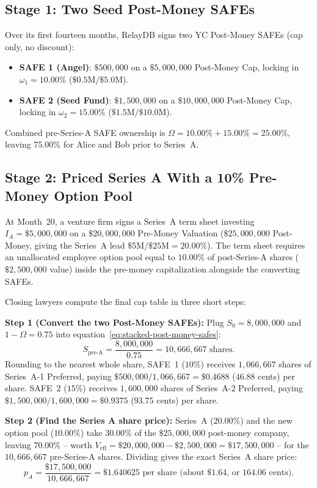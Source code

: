 \subsection{Stage 1: Two Seed Post-Money SAFEs}

Over its first fourteen months, RelayDB signs two YC Post-Money SAFEs (cap only, no discount):
\begin{itemize}
  \item \textbf{SAFE 1 (Angel)}: $\$500{,}000$ on a $\$5{,}000{,}000$ Post-Money Cap, locking in $\omega_1 = 10.00\%$ ($\$0.5\text{M} / \$5.0\text{M}$).
  \item \textbf{SAFE 2 (Seed Fund)}: $\$1{,}500{,}000$ on a $\$10{,}000{,}000$ Post-Money Cap, locking in $\omega_2 = 15.00\%$ ($\$1.5\text{M} / \$10.0\text{M}$).
\end{itemize}
Combined pre-Series-A SAFE ownership is $\Omega = 10.00\% + 15.00\% = 25.00\%$, leaving $75.00\%$ for Alice and Bob prior to Series~A.

\subsection{Stage 2: Priced Series A With a 10\% Pre-Money Option Pool}

At Month~20, a venture firm signs a Series~A term sheet investing $I_A = \$5{,}000{,}000$ on a $\$20{,}000{,}000$ Pre-Money Valuation ($\$25{,}000{,}000$ Post-Money, giving the Series~A lead $\$5\text{M} / \$25\text{M} = 20.00\%$). The term sheet requires an unallocated employee option pool equal to $10.00\%$ of post-Series-A shares ($\$2{,}500{,}000$ value) inside the pre-money capitalization alongside the converting SAFEs.

Closing lawyers compute the final cap table in three short steps:

\textbf{Step 1 (Convert the two Post-Money SAFEs):} Plug $S_0 = 8{,}000{,}000$ and $1 - \Omega = 0.75$ into equation~\eqref{eq:stacked-post-money-safes}:
\[
  S_{\text{pre-A}} = \frac{8{,}000{,}000}{0.75} = 10{,}666{,}667 \text{ shares.}
\]
Rounding to the nearest whole share, SAFE~1 ($10\%$) receives $1{,}066{,}667$ shares of Series~A-1 Preferred, paying $\$500{,}000 / 1{,}066{,}667 = \$0.4688$ ($46.88$ cents) per share. SAFE~2 ($15\%$) receives $1{,}600{,}000$ shares of Series~A-2 Preferred, paying $\$1{,}500{,}000 / 1{,}600{,}000 = \$0.9375$ ($93.75$ cents) per share.

\textbf{Step 2 (Find the Series A share price):} Series~A ($20.00\%$) and the new option pool ($10.00\%$) take $30.00\%$ of the $\$25{,}000{,}000$ post-money company, leaving $70.00\%$ -- worth $V_{\text{eff}} = \$20{,}000{,}000 - \$2{,}500{,}000 = \$17{,}500{,}000$ -- for the $10{,}666{,}667$ pre-Series-A shares. Dividing gives the exact Series~A share price:
\[
  p_A = \frac{\$17{,}500{,}000}{10{,}666{,}667} = \$1.640625 \text{ per share (about \$1.64, or $164.06$ cents).}
\]

